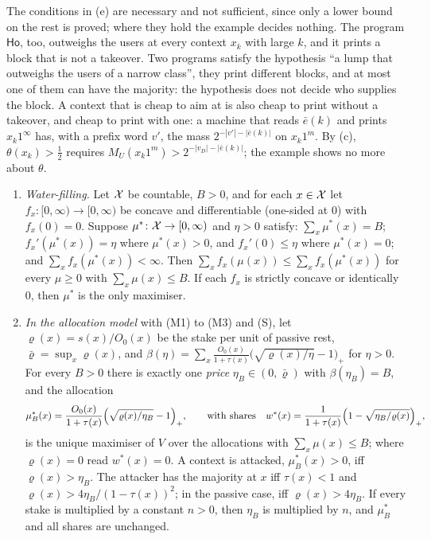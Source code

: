 The conditions in (e) are necessary and not sufficient, since only a lower bound on the rest is proved; where
they hold the example decides nothing. The program $\mathsf{Ho}$, too, outweighs the users at every context
$x_k$ with large $k$, and it prints a block that is not a takeover. Two programs satisfy the hypothesis ``a
lump that outweighs the users of a narrow class'', they print different blocks, and at most one of them can
have the majority: the hypothesis does not decide who supplies the block. A context that is cheap to aim at is
also cheap to print without a takeover, and cheap to print with one: a machine that reads $\bar e(k)$ and
prints $x_k1^\infty$ has, with a prefix word $v'$, the mass $2^{-|v'|-|\bar e(k)|}$ on $x_k1^m$. By (c),
$\theta(x_k)>\frac12$ requires $M_U(x_k1^m)>2^{-|v_D|-|\bar e(k)|}$; the example shows no more about $\theta$.
\begin{proposition}\label{prop:allocation}
\begin{enumerate}[label=(\alph*),leftmargin=2em,itemsep=1pt,topsep=2pt]
\item \emph{Water-filling.} Let $\mathcal X$ be countable, $B>0$, and for each $x\in\mathcal X$ let
$f_x\colon[0,\infty)\to[0,\infty)$ be concave and differentiable (one-sided at $0$) with $f_x(0)=0$. Suppose
$\mu^*\colon\mathcal X\to[0,\infty)$ and $\eta>0$ satisfy: $\sum_x\mu^*(x)=B$; $f_x'(\mu^*(x))=\eta$ where
$\mu^*(x)>0$, and $f_x'(0)\le\eta$ where $\mu^*(x)=0$; and $\sum_xf_x(\mu^*(x))<\infty$. Then
$\sum_xf_x(\mu(x))\le\sum_xf_x(\mu^*(x))$ for every $\mu\ge0$ with $\sum_x\mu(x)\le B$. If each $f_x$ is
strictly concave or identically $0$, then $\mu^*$ is the only maximiser.
\item \emph{In the allocation model} with (M1) to (M3) and (S), let $\varrho(x)=s(x)/O_0(x)$ be the stake
per unit of passive rest, $\bar\varrho=\sup_x\varrho(x)$, and
$\beta(\eta)=\sum_x\frac{O_0(x)}{1+\tau(x)}\bigl(\sqrt{\varrho(x)/\eta}-1\bigr)_+$ for $\eta>0$. For every
$B>0$ there is exactly one \emph{price} $\eta_B\in(0,\bar\varrho)$ with $\beta(\eta_B)=B$, and the allocation
\[\mu^*_B(x)=\frac{O_0(x)}{1+\tau(x)}\Bigl(\sqrt{\varrho(x)/\eta_B}-1\Bigr)_+,\qquad\text{with shares}\quad
w^*(x)=\frac1{1+\tau(x)}\Bigl(1-\sqrt{\eta_B/\varrho(x)}\Bigr)_+ ,\]
is the unique maximiser of $V$ over the allocations with $\sum_x\mu(x)\le B$; where $\varrho(x)=0$ read
$w^*(x)=0$. A context is attacked, $\mu^*_B(x)>0$, iff $\varrho(x)>\eta_B$. The attacker has the majority at
$x$ iff $\tau(x)<1$ and $\varrho(x)>4\eta_B/(1-\tau(x))^2$; in the passive case, iff $\varrho(x)>4\eta_B$. If
every stake is multiplied by a constant $n>0$, then $\eta_B$ is multiplied by $n$, and $\mu^*_B$ and all
shares are unchanged.
\end{enumerate}\end{proposition}
